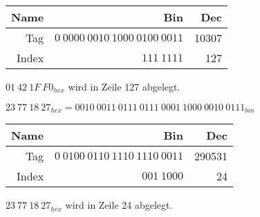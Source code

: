 \documentclass[10pt]{article}
\begin{document}
\begin{enumerate}[label=\alph*)]
		\begin{tabular}{r | r | r}
			Name & Bin & Dec\\
			\hline
			Tag & $0\:0000\:0010\:1000\:0100\:0011$ & 10307\\
			Index & $111\:1111$ & 127\\
		\end{tabular}

		$01\:42\:1F\:F0_{hex}$ wird in Zeile 127 abgelegt.
		
		$23\:77\:18\:27_{hex} = 0010\:0011\:0111\:0111\:0001\:1000\:0010\:0111_{bin}$
		
		\begin{tabular}{r | r | r}
			Name & Bin & Dec\\
			\hline
			Tag & $0\:0100\:0110\:1110\:1110\:0011$ & 290531\\
			Index & $001\:1000$ & 24\\
		\end{tabular}
		
		$23\:77\:18\:27_{hex}$ wird in Zeile 24 abgelegt.
		
\end{enumerate}
\end{document}
